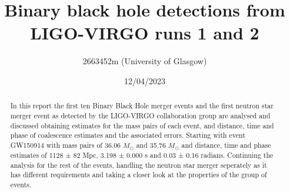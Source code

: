 \documentclass[]{article}
\title{\textbf{Binary black hole detections from LIGO-VIRGO runs 1 and 2}}
\author{2663452m (University of Glasgow)}
\date{12/04/2023}
\begin{document}
\maketitle

\begin{abstract}
In this report the first ten Binary Black Hole merger events and the first neutron star merger event as
detected by the LIGO-VIRGO collaboration group are analysed and discussed obtaining estimates for the mass
pairs of each event, and distance, time and phase of coalescence estimates and the associated errors. Starting with
event GW150914 with mass pairs of 36.06 $M_{\odot}$ and 35.76 $M_{\odot}$ and distance, time and phase estimates of
1128 ± 82 Mpc, 3.198 ± 0.000 s and 0.03 ± 0.16 radians. Continuing the analysis for the rest of the events, handling the neutron star merger
seperately as it has different requirements and taking a closer look at the properties of the group of events.
\end{abstract}
\twocolumn
\newpage
\end{document}
